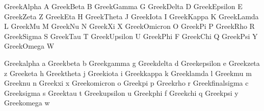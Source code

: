 

\startencoding[default]

%
%

 GreekAlpha        {A}
 GreekBeta         {B}
 GreekGamma        {G}
 GreekDelta        {D}
 GreekEpsilon      {E}
 GreekZeta         {Z}
 GreekEta          {H}
 GreekTheta        {J}
 GreekIota         {I}
 GreekKappa        {K}
 GreekLamda        {L}
 GreekMu           {M}
 GreekNu           {N}
 GreekXi           {X}
 GreekOmicron      {O}
 GreekPi           {P}
 GreekRho          {R}
 GreekSigma        {S}
 GreekTau          {T}
 GreekUpsilon      {U}
 GreekPhi          {F}
 GreekChi          {Q}
 GreekPsi          {Y}
 GreekOmega        {W}

%
%

 Greekalpha        {a}
 Greekbeta         {b}
 Greekgamma        {g}
 Greekdelta        {d}
 Greekepsilon      {e}
 Greekzeta         {z}
 Greeketa          {h}
 Greektheta        {j}
 Greekiota         {i}
 Greekkappa        {k}
 Greeklamda        {l}
 Greekmu           {m}
 Greeknu           {n}
 Greekxi           {x}
 Greekomicron      {o}
 Greekpi           {p}
 Greekrho          {r}
 Greekfinalsigma   {c}
 Greeksigma        {s}
 Greektau          {t}
 Greekupsilon      {u}
 Greekphi          {f}
 Greekchi          {q}
 Greekpsi          {y}
 Greekomega        {w}

